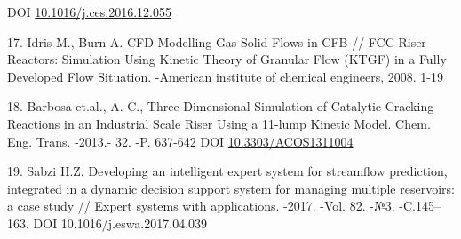\begin{references}
DOI
\href{http://dx.doi.org/10.1016/j.ces.2016.12.055}{10.1016/j.ces.2016.12.055}

17. Idris M., Burn A. CFD Modelling Gas-Solid Flows in CFB // FCC Riser
Reactors: Simulation Using Kinetic Theory of Granular Flow (KTGF) in a
Fully Developed Flow Situation. -American institute of chemical
engineers, 2008. 1-19

18. Barbosa et.al., A. C., Three-Dimensional Simulation of Catalytic
Cracking Reactions in an Industrial Scale Riser Using a 11-lump Kinetic
Model. Chem. Eng. Trans. -2013.- 32. -P. 637-642 DOI
\href{http://dx.doi.org/10.3303/ACOS1311004}{10.3303/ACOS1311004}

19. Sabzi H.Z. Developing an intelligent expert system for streamflow
prediction, integrated in a dynamic decision support system for managing
multiple reservoirs: a case study // Expert systems with applications.
-2017. -Vol. 82. -№3. -C.145--163. DOI 10.1016/j.eswa.2017.04.039
\end{references}

